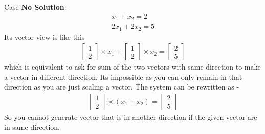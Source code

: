 \documentclass{article}
\begin{document}
Case \textbf{No Solution}:
\begin{align}
    x_1 + x_2 = 2 \nonumber\\
    2x_1 + 2x_2 = 5  \nonumber
\end{align}
Its vector view is like this
\begin{align}
    \begin{bmatrix}
    1\\2
    \end{bmatrix} \times x_1 +
    \begin{bmatrix}
    1\\2
    \end{bmatrix} \times x_2 = 
    \begin{bmatrix}
    2\\5
    \end{bmatrix} \nonumber
\end{align}
which is equivalent to ask for sum of the two vectors with same direction to make a vector in different direction. Its impossible as you can only remain in that direction as you are just scaling a vector. The system can be rewritten as -
\begin{align}
    \begin{bmatrix}
    1\\2
    \end{bmatrix} \times (x_1 +x_2)=\begin{bmatrix}
    2\\5
    \end{bmatrix} \nonumber
\end{align}
So you cannot generate vector that is in another direction if the given vector are in same direction.
\end{document}
